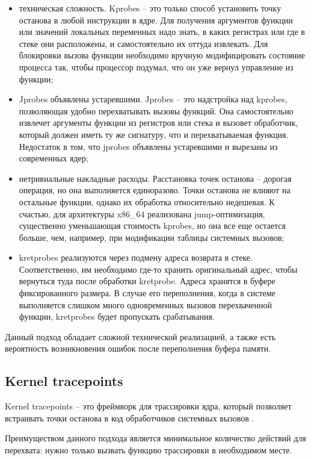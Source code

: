 \begin{itemize}
	\item техническая сложность. Kprobes -- это только способ установить точку останова в любой инструкции в ядре. Для получения аргументов функции или значений локальных переменных надо знать, в каких регистрах или где в стеке они расположены, и самостоятельно их оттуда извлекать. Для блокировки вызова функции необходимо вручную модифицировать состояние процесса так, чтобы процессор подумал, что он уже вернул управление из функции;
	\item Jprobes объявлены устаревшими. Jprobes -- это надстройка над kprobes, позволяющая удобно перехватывать вызовы функций. Она самостоятельно извлечет аргументы функции из регистров или стека и вызовет обработчик, который должен иметь ту же сигнатуру, что и перехватываемая функция. Недостаток в том, что jprobes объявлены устаревшими и вырезаны из современных ядер;
	\item нетривиальные накладные расходы. Расстановка точек останова -- дорогая операция, но она выполняется единоразово. Точки останова не влияют на остальные функции, однако их обработка относительно недешевая. К счастью, для архитектуры x86\_64 реализована jump-оптимизация, существенно уменьшающая стоимость kprobes, но она все еще остается больше, чем, например, при модификации таблицы системных вызовов;
	\item kretprobes реализуются через подмену адреса возврата в стеке. Соответственно, им необходимо где-то хранить оригинальный адрес, чтобы вернуться туда после обработки kretprobe. Адреса хранятся в буфере фиксированного размера. В случае его переполнения, когда в системе выполняется слишком много одновременных вызовов перехваченной функции, kretprobes будет пропускать срабатывания.
\end{itemize}

Данный подход обладает сложной технической реализацией, а также есть вероятность возникновения ошибок после переполнения буфера памяти.

\subsection{Kernel tracepoints}

Kernel tracepoints -- это фреймворк для трассировки ядра, который позволяет встраивать точки останова в код обработчиков системных вызовов \cite{core_ftrace}.

Преимуществом данного подхода является минимальное количество действий для перехвата: нужно только вызвать функцию трассировки в необходимом месте.

